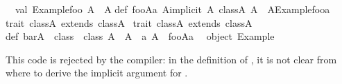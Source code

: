 \begin{isabellebody}
\begin{isamarkuptext}
\ \ val\ {}Example{}foo{}{}\ A\ {}{}\ A\isanewline
{}\isanewline
def\ foo{}A{}{}a{}\ A{}{}implicit\ A{}\ class{}{}A{}{}{}\ A\ {}\ A{}{}Example{}foo{}{}a{}\isanewline
\isanewline
trait\ class{}{}A{}\ extends\ class{}{}A{}\ {}\isanewline
{}\isanewline
\isanewline
trait\ class{}{}A{}\ extends\ class{}{}A{}\ {}\isanewline
{}\isanewline
\isanewline
def\ bar{}A\ {}\ class{}\ {}\ class{}{}{}\ A\ {}{}\ A\ {}\ {}a{}\ A{}\ {}{}\ foo{}A{}{}a{}\isanewline
\isanewline
{}\ {}{}\ object\ Example\ {}{}\isanewline%
\end{isamarkuptext}%
\isamarkuptrue%
%
\endisatagquotetypewriter
{\isafoldquotetypewriter}%
%
\isadelimquotetypewriter
%
\endisadelimquotetypewriter
%
\begin{isamarkuptext}%
\noindent This code is rejected by the  compiler: in
  the definition of , it is not clear from where to derive
  the implicit argument for .


\end{isamarkuptext}
\end{isabellebody}

